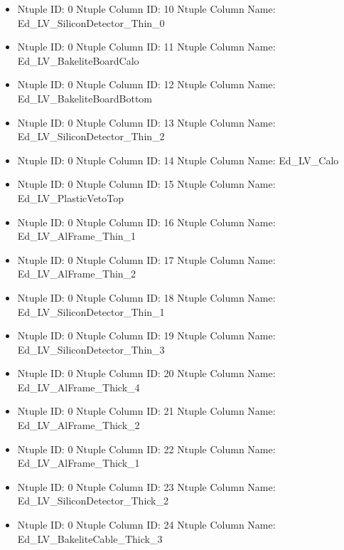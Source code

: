 \documentclass[8pt]{beamer}
\begin{document}
\begin{frame}
\begin{itemize}
        \item Ntuple ID: 0 Ntuple Column ID: 10 Ntuple Column Name: Ed\_LV\_SiliconDetector\_Thin\_0
        
        \item Ntuple ID: 0 Ntuple Column ID: 11 Ntuple Column Name: Ed\_LV\_BakeliteBoardCalo
        
        \item Ntuple ID: 0 Ntuple Column ID: 12 Ntuple Column Name: Ed\_LV\_BakeliteBoardBottom
        
        \item Ntuple ID: 0 Ntuple Column ID: 13 Ntuple Column Name: Ed\_LV\_SiliconDetector\_Thin\_2
        
        \item Ntuple ID: 0 Ntuple Column ID: 14 Ntuple Column Name: Ed\_LV\_Calo
        
        \item Ntuple ID: 0 Ntuple Column ID: 15 Ntuple Column Name: Ed\_LV\_PlasticVetoTop
        
        \item Ntuple ID: 0 Ntuple Column ID: 16 Ntuple Column Name: Ed\_LV\_AlFrame\_Thin\_1
        
        \item Ntuple ID: 0 Ntuple Column ID: 17 Ntuple Column Name: Ed\_LV\_AlFrame\_Thin\_2
        
        \item Ntuple ID: 0 Ntuple Column ID: 18 Ntuple Column Name: Ed\_LV\_SiliconDetector\_Thin\_1
        
        \item Ntuple ID: 0 Ntuple Column ID: 19 Ntuple Column Name: Ed\_LV\_SiliconDetector\_Thin\_3
        
        \item Ntuple ID: 0 Ntuple Column ID: 20 Ntuple Column Name: Ed\_LV\_AlFrame\_Thick\_4
        
        \item Ntuple ID: 0 Ntuple Column ID: 21 Ntuple Column Name: Ed\_LV\_AlFrame\_Thick\_2
        
        \item Ntuple ID: 0 Ntuple Column ID: 22 Ntuple Column Name: Ed\_LV\_AlFrame\_Thick\_1
        
        \item Ntuple ID: 0 Ntuple Column ID: 23 Ntuple Column Name: Ed\_LV\_SiliconDetector\_Thick\_2
        
        \item Ntuple ID: 0 Ntuple Column ID: 24 Ntuple Column Name: Ed\_LV\_BakeliteCable\_Thick\_3
        

\end{itemize}
\end{frame}
\end{document}
